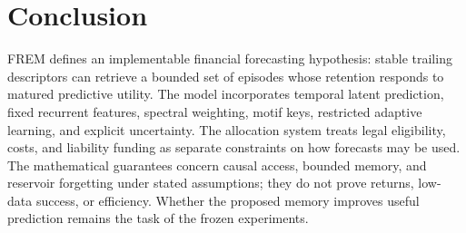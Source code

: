 \documentclass[11pt,a4paper]{article}
\begin{document}
\section{Conclusion}

FREM defines an implementable financial forecasting hypothesis: stable trailing descriptors can retrieve a bounded set of episodes whose retention responds to matured predictive utility. The model incorporates temporal latent prediction, fixed recurrent features, spectral weighting, motif keys, restricted adaptive learning, and explicit uncertainty. The allocation system treats legal eligibility, costs, and liability funding as separate constraints on how forecasts may be used. The mathematical guarantees concern causal access, bounded memory, and reservoir forgetting under stated assumptions; they do not prove returns, low-data success, or efficiency. Whether the proposed memory improves useful prediction remains the task of the frozen experiments.

\appendix
\end{document}
